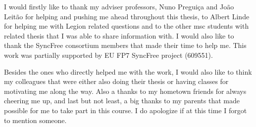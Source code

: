 \acknowledgements

I would firstly like to thank my adviser professors, Nuno Preguiça and João Leitão for helping and pushing me ahead throughout this thesis, to Albert Linde for helping me with Legion related questions and to the other msc students with related thesis that I was able to share information with. I would also like to thank the SyncFree consortium members that made their time to help me. This work was partially supported by EU FP7 SyncFree project (609551).\par
	Besides the ones who directly helped me with the work, I would also like to think my colleagues that were either also doing their thesis or having classes for motivating me along the way. Also a thanks to my hometown friends for always cheering me up, and last but not least, a big thanks to my parents that made possible for me to take part in this course. I do apologize if at this time I forgot to mention someone.

